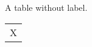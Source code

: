 \documentclass{amsart}
\begin{document}
\begin{table}
A table without label.

\begin{tabular}{r}
\rowcolor{gray!20} X
\end{tabular}

\end{table}
\end{document}
